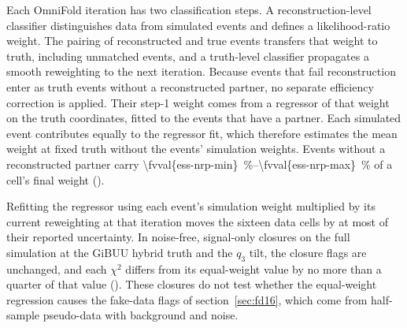 Each OmniFold iteration has two classification steps. A reconstruction-level classifier distinguishes data from simulated events and defines a likelihood-ratio weight. The pairing of reconstructed and true events transfers that weight to truth, including unmatched events, and a truth-level classifier propagates a smooth reweighting to the next iteration. Because events that fail reconstruction enter as truth events without a reconstructed partner, no separate efficiency correction is applied. Their step-1 weight comes from a regressor of that weight on the truth coordinates, fitted to the events that have a partner. Each simulated event contributes equally to the regressor fit, which therefore estimates the mean weight at fixed truth without the events' simulation weights. Events without a reconstructed partner carry \SIrange{\fvval{ess-nrp-min}}{\fvval{ess-nrp-max}}{\percent} of a cell's final weight ().

Refitting the regressor using each event's simulation weight multiplied by its current reweighting at that iteration moves the sixteen data cells by at most  of their reported uncertainty. In noise-free, signal-only closures on the full simulation at the GiBUU hybrid truth and the $q_3$ tilt, the closure flags are unchanged, and each $\chi^2$ differs from its equal-weight value by no more than a quarter of that value (). These closures do not test whether the equal-weight regression causes the fake-data flags of section~\ref{sec:fd16}, which come from half-sample pseudo-data with background and noise.


